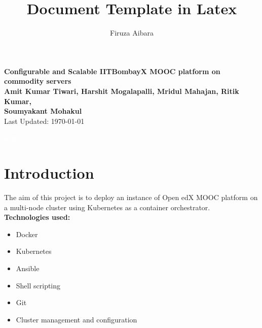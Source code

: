 \documentclass[12pt]{article}
\title{Document Template in Latex}
\author{Firuza Aibara}
\begin{document}
\begin{titlepage}
 \begin{center}
\Huge
\textbf{Configurable and Scalable IITBombayX MOOC platform on commodity servers} \\
\vfill
\LARGE
\textbf{Amit Kumar Tiwari, Harshit Mogalapalli, Mridul Mahajan, Ritik Kumar,\\ Soumyakant Mohakul}\\
\vfill
\Large
Last Updated: \today
\end{center}
\end{titlepage}

 \pagebreak \textcolor{white}{text} \pagebreak
\thispagestyle{empty}

\pagebreak
\setcounter{page}{1}

\listoffigures

\pagebreak

\listoftables

\pagebreak

\tableofcontents

\pagebreak

\setcounter{page}{1}


\section{Introduction}

The aim of this project is to deploy an instance of Open edX MOOC platform on a multi-node cluster using Kubernetes as a container orchestrator. \\

\textbf{Technologies used:}
\begin{itemize}
	\item Docker
	\item Kubernetes
	\item Ansible
	\item Shell scripting
	\item Git
	\item Cluster management and configuration
\end{itemize}


\end{document}
